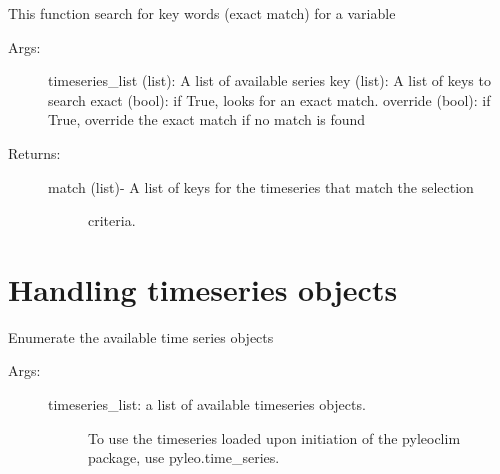 \documentclass[letterpaper,10pt,english]{sphinxmanual}
\begin{document}

\begin{fulllineitems}
\label{\detokenize{LipdUtils:pyleoclim.LipdUtils.searchVar}}
This function search for key words (exact match) for a variable
\begin{description}
\item[{Args:}] \leavevmode
timeseries\_list (list): A list of available series
key (list): A list of keys to search
exact (bool): if True, looks for an exact match.
override (bool): if True, override the exact match if no match is found

\item[{Returns:}] \leavevmode\begin{description}
\item[{match (list)- A list of keys for the timeseries that match the selection}] \leavevmode
criteria.

\end{description}

\end{description}

\end{fulllineitems}



\section{Handling timeseries objects}
\label{\detokenize{LipdUtils:handling-timeseries-objects}}

\begin{fulllineitems}
\label{\detokenize{LipdUtils:pyleoclim.LipdUtils.enumerateTs}}
Enumerate the available time series objects
\begin{description}
\item[{Args:}] \leavevmode\begin{description}
\item[{timeseries\_list: a  list of available timeseries objects. }] \leavevmode
To use the timeseries loaded upon initiation of the 
pyleoclim package, use pyleo.time\_series.

\end{description}

\end{description}

\end{fulllineitems}
\end{document}

